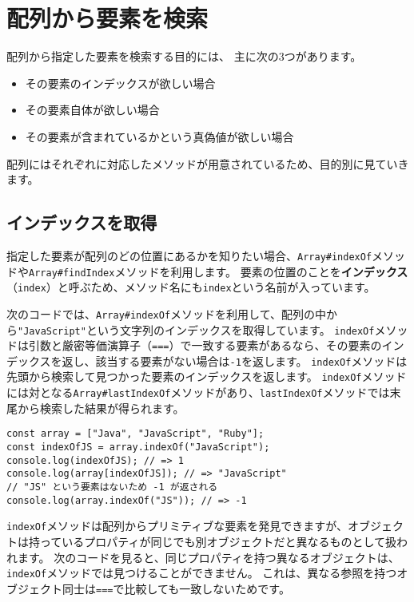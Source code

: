 \hypertarget{search-element}{%
\section{配列から要素を検索}\label{search-element}}

配列から指定した要素を検索する目的には、 主に次の3つがあります。

\begin{itemize}
\item
  その要素のインデックスが欲しい場合
\item
  その要素自体が欲しい場合
\item
  その要素が含まれているかという真偽値が欲しい場合
\end{itemize}

配列にはそれぞれに対応したメソッドが用意されているため、目的別に見ていきます。

\hypertarget{indexof}{%
\subsection{インデックスを取得}\label{indexof}}

指定した要素が配列のどの位置にあるかを知りたい場合、\texttt{Array\#indexOf}メソッドや\texttt{Array\#findIndex}メソッド\protect{}を利用します。
要素の位置のことを\textbf{インデックス}（\texttt{index}）と呼ぶため、メソッド名にも\texttt{index}という名前が入っています。

次のコードでは、\texttt{Array\#indexOf}メソッドを利用して、配列の中から\texttt{"JavaScript"}という文字列のインデックスを取得しています。
\texttt{indexOf}メソッドは引数と厳密等価演算子（\texttt{===}）で一致する要素があるなら、その要素のインデックスを返し、該当する要素がない場合は\texttt{-1}を返します。
\texttt{indexOf}メソッドは先頭から検索して見つかった要素のインデックスを返します。
\texttt{indexOf}メソッドには対となる\texttt{Array\#lastIndexOf}メソッドがあり、\texttt{lastIndexOf}メソッドでは末尾から検索した結果が得られます。

\begin{lstlisting}
const array = ["Java", "JavaScript", "Ruby"];
const indexOfJS = array.indexOf("JavaScript");
console.log(indexOfJS); // => 1
console.log(array[indexOfJS]); // => "JavaScript"
// "JS" という要素はないため -1 が返される
console.log(array.indexOf("JS")); // => -1
\end{lstlisting}

\texttt{indexOf}メソッドは配列からプリミティブな要素を発見できますが、オブジェクトは持っているプロパティが同じでも別オブジェクトだと異なるものとして扱われます。
次のコードを見ると、同じプロパティを持つ異なるオブジェクトは、\texttt{indexOf}メソッドでは見つけることができません。
これは、異なる参照を持つオブジェクト同士は\texttt{===}で比較しても一致しないためです。

